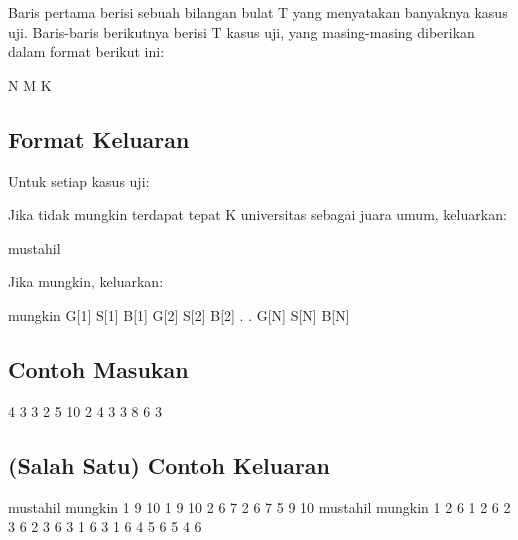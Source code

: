 \documentclass[../main_problemset.tex]{subfiles} %
\begin{document}
Baris pertama berisi sebuah bilangan bulat T yang menyatakan banyaknya kasus uji. Baris-baris berikutnya berisi T kasus uji, yang masing-masing diberikan dalam format berikut ini:

\begin{lcverbatim}
N M K
\end{lcverbatim}

\subsection*{Format Keluaran}

Untuk setiap kasus uji:

Jika tidak mungkin terdapat tepat K universitas sebagai juara umum, keluarkan:

\begin{lcverbatim}
mustahil
\end{lcverbatim}

Jika mungkin, keluarkan:

\begin{lcverbatim}
mungkin
G[1] S[1] B[1]
G[2] S[2] B[2]
.
.
G[N] S[N] B[N]
\end{lcverbatim}

\vspace{.4cm}

\begin{minipage}[t]{0.5\textwidth}
\subsection*{Contoh Masukan}

\begin{lcverbatim}
4
3 3 2
5 10 2
4 3 3
8 6 3
\end{lcverbatim}
\end{minipage}
\begin{minipage}[t]{0.5\textwidth}
\subsection*{(Salah Satu) Contoh Keluaran}

\begin{lcverbatim}
mustahil
mungkin
1 9 10
1 9 10
2 6 7
2 6 7
5 9 10
mustahil
mungkin
1 2 6
1 2 6
2 3 6
2 3 6
3 1 6
3 1 6
4 5 6
5 4 6
\end{lcverbatim}
\end{minipage}
\end{document}
